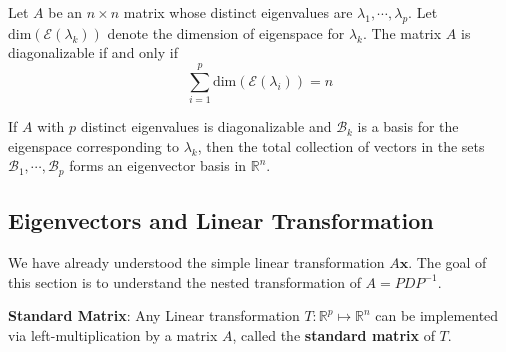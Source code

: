 \begin{Thm}
    Let $A$ be an $n\times n$ matrix whose distinct eigenvalues are $\lambda_1, \cdots, \lambda_p$.
    Let $\text{dim}(\mathcal{E}(\lambda_k))$ denote the dimension of eigenspace for  $\lambda_k$. The matrix $A$ is diagonalizable if and only if
    \begin{equation*}
        \sum_{i = 1} ^{p} \text{dim}(\mathcal{E}(\lambda_i)) = n
    \end{equation*}
\end{Thm}

\begin{Thm}
    If $A$ with $p$ distinct eigenvalues is diagonalizable and $\mathcal{B}_k$ is a basis for the eigenspace corresponding to $\lambda_k$, then the total collection of vectors in the sets $\mathcal{B}_1, \cdots, \mathcal{B}_p$ forms an eigenvector basis in $\mathbb{R}^n$.
\end{Thm}

\subsection{Eigenvectors and Linear Transformation}
We have already understood the simple linear transformation $A\mathbf{x}$. The goal of this section is to understand the nested transformation of $A = PDP^{-1}$.
\begin{Def}
    \textbf{Standard Matrix}:
    Any Linear transformation $T: \mathbb{R}^p \mapsto \mathbb{R}^n$ can be implemented via left-multiplication by a matrix $A$, called the \textbf{standard matrix} of $T$.
\end{Def}

